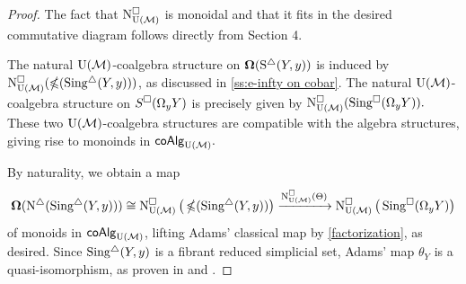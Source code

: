 \begin{proof}
	The fact that $\cchainsUM$ is monoidal and that it fits in the desired commutative diagram follows directly from Section 4.
	    
	The natural $\UM$-coalgebra structure on $\cobar(\sS(Y, y))$ is induced by $\cchainsUM ( \ccobar (\sSing(Y,y)) )$, as discussed in \cref{ss:e-infty on cobar}.
	The natural $\UM$-coalgebra structure on $S^{\cube}(\Omega_yY)$ is precisely given by $\cchainsUM( \cSing(\Omega_yY) ).$ These two $\UM$-coalgebra structures are compatible with the algebra structures, giving rise to monoinds in $\coAlg_{\UM}.$
	     
	By naturality, we obtain a map
	\begin{equation*}
	\cobar(\schains(\sSing(Y, y))) \cong
	\cchainsUM \big( \ccobar(\sSing(Y, y)) \big) \xra{\cchainsUM(\Theta)}
	\cchainsUM \big( \cSing(\Omega_y Y) \big)
	\end{equation*}
	of monoids in $\coAlg_{\UM}$, lifting Adams' classical map by \cref{factorization}, as desired.
	Since $\sSing(Y,y)$ is a fibrant reduced simplicial set, Adams' map $\theta_Y$ is a quasi-isomorphism, as proven in \cite{rivera2018cubical} and \cite{rivera2019path}. 
\end{proof}

